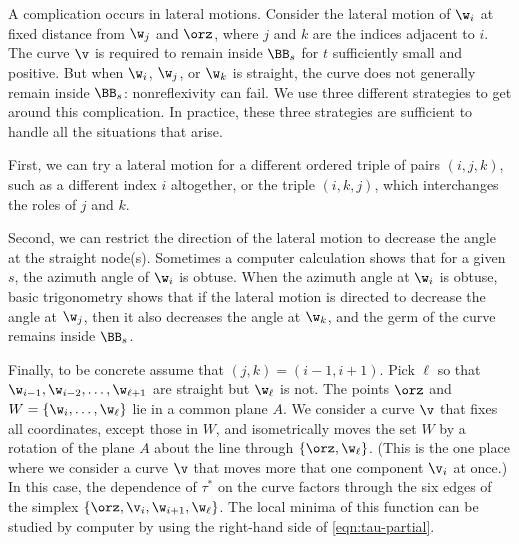 \figGJBTZJI %

\begin{remark}
  A complication occurs in lateral motions.  Consider the lateral
  motion of $\w_i$ at fixed distance from $\w_j$ and $\orz$, where $j$
  and $k$ are the indices adjacent to $i$.  The curve $\v$ is required
  to remain inside $\BB_s$ for $t$ sufficiently small and positive.
  But when $\w_i$, $\w_j$, or $\w_k$ is straight, the curve does not
  generally remain inside $\BB_s$: nonreflexivity can fail.  We use
  three different strategies to get around this complication.  In
  practice, these three strategies are sufficient to handle all the
  situations that arise.

  First, we can try a lateral motion for a different ordered triple of
  pairs $(i,j,k)$, such as a different index $i$ altogether, or the
  triple $(i,k,j)$, which interchanges the roles of $j$ and $k$.
 
  Second, we can restrict the direction of the lateral motion to
  decrease the angle at the straight node(s).  Sometimes a computer
  calculation shows that for a given $s$, the azimuth angle of $\w_i$
  is obtuse.  When the azimuth angle at $\w_i$ is obtuse, basic
  trigonometry shows that if the lateral motion is directed to
  decrease the angle at $\w_j$, then it also decreases the angle at
  $\w_k$, and the germ of the curve remains inside $\BB_s$.

  Finally, to be concrete assume that $(j,k)=(i-1,i+1)$.  Pick $\ell$
  so that $\w_{i-1},\w_{i-2},\ldots,\w_{\ell+1}$ are straight but
  $\w_{\ell}$ is not. The points $\orz$ and
  $W=\{\w_{i},\ldots,\w_{\ell}\}$ lie in a common plane $A$.  We
  consider a curve $\v$ that fixes all coordinates, except those in
  $W$, and isometrically moves the set $W$ by a rotation of the plane
  $A$ about the line through $\{\orz,\w_{\ell}\}$.  (This is the one
  place where we consider a curve $\v$ that moves more that one
  component $\v_i$ at once.)  In this case, the dependence of $\tau^*$
  on the curve factors through the six edges of the simplex
  $\{\orz,\v_i,\w_{i+1},\w_{\ell}\}$.  The local minima of this
  function can be studied by computer by using the right-hand side of
  \eqref{eqn:tau-partial}.
\end{remark}

